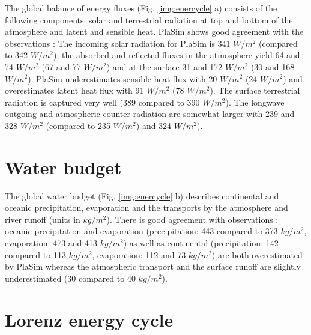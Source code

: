 \documentclass[12pt,a4paper,twoside,openright,headinclude,liststotoc,bibtotoc]{scrreprt}
\begin{document}
The global balance of energy fluxes (Fig. \ref{img:enercycle} a) consists of the following components: solar and terrestrial radiation at top and bottom of the atmosphere and latent and sensible heat. PlaSim shows good agreement with the observations \citep{Kiehl1997}: The incoming solar radiation for PlaSim is 341 $W/m^2$ (compared to 342 $W/m^2$); the absorbed and reflected fluxes in the atmosphere yield 64 and 74 $W/m^2$ (67 and 77 $W/m^2$) and at the surface 31 and 172 $W/m^2$ (30 and 168 $W/m^2$). PlaSim underestimates sensible heat flux with 20 $W/m^2$ (24 $W/m^2$) and overestimates latent heat flux with 91 $W/m^2$ (78 $W/m^2$). The surface terrestrial radiation is captured very well (389 compared to 390 $W/m^2$). The longwave outgoing and atmospheric counter radiation are somewhat larger with 239 and 328 $W/m^2$ (compared to 235 $W/m^2$) and 324 $W/m^2$).


\vspace{-0.4cm}
\section{Water budget}
\vspace{-0.4cm}

The global water budget (Fig. \ref{img:enercycle} b) describes continental and oceanic precipitation, evaporation and the transports by the atmosphere and river runoff (units in $kg/m^{2}$). There is good agreement with observations \citep{Trenberth2006}: oceanic precipitation and evaporation (precipitation: 443 compared to 373 $kg/m^{2}$, evaporation: 473 and 413 $kg/m^{2}$) as well as continental (precipitation: 142 compared to 113 $kg/m^{2}$, evaporation: 112 and 73 $kg/m^{2}$) are both overestimated by PlaSim whereas the atmospheric transport and the surface runoff are slightly underestimated (30 compared to 40 $kg/m^{2}$).

\vspace{-0.4cm}
\section{Lorenz energy cycle}
\vspace{-0.4cm}
\end{document}
